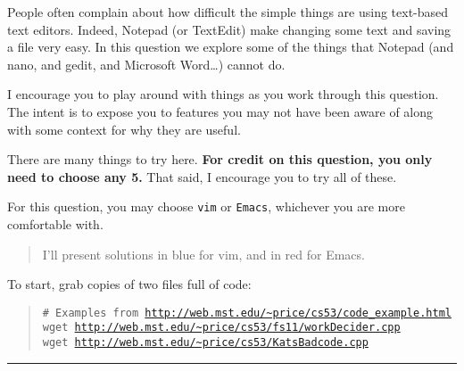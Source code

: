 \documentclass{article}
\begin{document}
People often complain about how difficult the simple things are using
text-based text editors. Indeed, Notepad (or TextEdit) make changing some
text and saving a file very easy.
In this question we explore some of the things that Notepad (and nano, and
gedit, and Microsoft Word\dots) cannot do.

I encourage you to play around with things as you work through this question.
The intent is to expose you to features you may not have been aware of along
with some context for why they are useful.

There are many things to try here.
\textbf{For credit on this question, you only need to choose any 5.}
That said, I encourage you to try all of these.

For this question, you may choose \texttt{vim} or \texttt{Emacs}, whichever
you are more comfortable with.

\begin{quote}
  \color{blue}I'll present solutions in blue for vim, \color{red}and in red for Emacs.
\end{quote}

\medskip
\noindent
To start, grab copies of two files full of code:
\begin{quote}
  \texttt{\# Examples from \url{http://web.mst.edu/~price/cs53/code_example.html}}\\
  \texttt{wget \url{http://web.mst.edu/~price/cs53/fs11/workDecider.cpp}}\\
  \texttt{wget \url{http://web.mst.edu/~price/cs53/KatsBadcode.cpp}}
\end{quote}
\smallskip
\hrule
\bigskip
\end{document}
